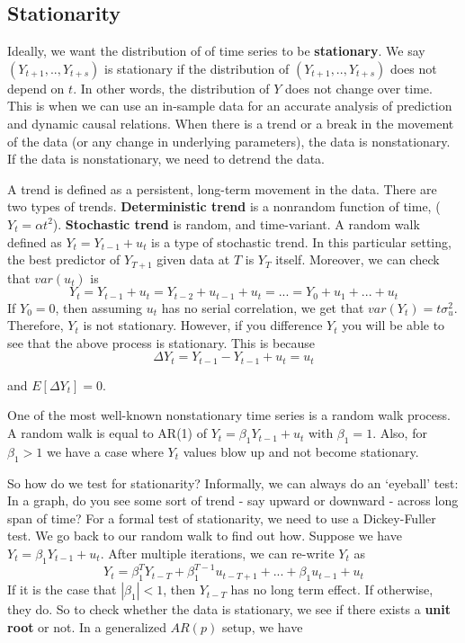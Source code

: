 \documentclass[12pt]{article}
\theoremstyle{definition}
\theoremstyle{property}
\theoremstyle{assumption}
\theoremstyle{example}
\theoremstyle{comment}
\begin{document}
\subsection{Stationarity}
Ideally, we want the distribution of of time series to be \textbf{stationary}. We say $(Y_{t+1},..,Y_{t+s})$ is stationary if the distribution of $(Y_{t+1},..,Y_{t+s})$ does not depend on $t$. In other words, the distribution of $Y$ does not change over time. This is when we can use an in-sample data for an accurate analysis of prediction and dynamic causal relations. When there is a trend or a break in the movement of the data (or any change in underlying parameters), the data is nonstationary. If the data is nonstationary, we need to detrend the data. 
\par\medskip
A trend is defined as a persistent, long-term movement in the data. There are two types of trends. \textbf{Deterministic trend} is a nonrandom  function of time, ($Y_t = \alpha t^2$). \textbf{Stochastic trend} is random, and time-variant. A random walk defined as $Y_t = Y_{t-1}+u_t$ is a type of stochastic trend. In this particular setting, the best predictor of $Y_{T+1}$ given data at $T$ is $Y_T$ itself. Moreover, we can check that $var(u_t)$ is
\[
Y_t = Y_{t-1}+u_t = Y_{t-2}+u_{t-1}+u_t = ... = Y_0 + u_1 + ... +u_t
\]
If $Y_0=0$,  then assuming $u_t$ has no serial correlation, we get that $var(Y_t)=t\sigma_u^2$. Therefore, $Y_t$ is not stationary. However, if you difference $Y_t$ you will be able to see that the above process is stationary. This is because
\[
\Delta Y_t = Y_{t-1}-Y_{t-1}+u_t = u_t
\]\par\medskip
and $E[\Delta Y_t ]=0$.
\par\medskip
One of the most well-known nonstationary time series is a random walk process. A random walk is equal to AR(1) of $Y_t = \beta_1Y_{t-1}+u_t$ with $\beta_1=1$. Also, for $\beta_1>1$ we have a case where $Y_t$ values blow up and not become stationary. 
\par\medskip
So how do we test for stationarity? Informally, we can always do an `eyeball' test: In a graph, do you see some sort of trend - say upward or downward - across long span of time? For a formal test of stationarity, we need to use a Dickey-Fuller test. We go back to our random walk to find out how. Suppose we have $Y_t = \beta_1 Y_{t-1}+u_t$. After multiple iterations, we can re-write $Y_t$ as
\[
Y_t = \beta_1^T Y_{t-T}+\beta_1^{T-1}u_{t-T+1}+...+\beta_1 u_{t-1}+u_t
\]
If it is the case that $|\beta_1|<1$, then $Y_{t-T}$ has no long term effect. If otherwise, they do. So to check whether the data is stationary, we see if there exists a \textbf{unit root} or not. In a generalized $AR(p)$ setup, we have 
\end{document}

